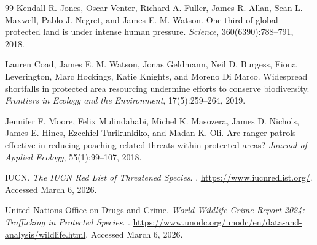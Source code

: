 \begin{thebibliography}{99}
Kendall R. Jones, Oscar Venter, Richard A. Fuller, James R. Allan, Sean L. Maxwell, Pablo J. Negret, and James E. M. Watson.
\newblock One-third of global protected land is under intense human pressure.
\newblock \emph{Science}, 360(6390):788--791, 2018.

Lauren Coad, James E. M. Watson, Jonas Geldmann, Neil D. Burgess, Fiona Leverington, Marc Hockings, Katie Knights, and Moreno Di Marco.
\newblock Widespread shortfalls in protected area resourcing undermine efforts to conserve biodiversity.
\newblock \emph{Frontiers in Ecology and the Environment}, 17(5):259--264, 2019.

Jennifer F. Moore, Felix Mulindahabi, Michel K. Masozera, James D. Nichols, James E. Hines, Ezechiel Turikunkiko, and Madan K. Oli.
\newblock Are ranger patrols effective in reducing poaching-related threats within protected areas?
\newblock \emph{Journal of Applied Ecology}, 55(1):99--107, 2018.

IUCN.
\newblock \emph{The IUCN Red List of Threatened Species}.
.
\newblock \url{https://www.iucnredlist.org/}. Accessed March 6, 2026.

United Nations Office on Drugs and Crime.
\newblock \emph{World Wildlife Crime Report 2024: Trafficking in Protected Species}.
.
\newblock \url{https://www.unodc.org/unodc/en/data-and-analysis/wildlife.html}. Accessed March 6, 2026.

\end{thebibliography}
